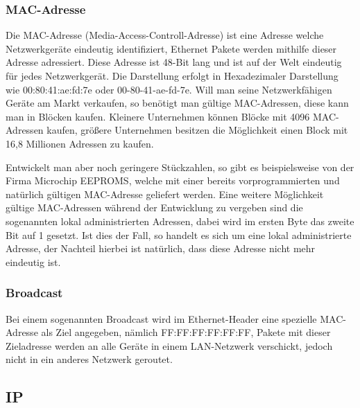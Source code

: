 \documentclass[a4paper,14pt,headsepline]{scrartcl}
\begin{document}
\subsubsection{MAC-Adresse}
Die MAC-Adresse (Media-Access-Controll-Adresse) ist eine Adresse welche Netzwerkgeräte eindeutig identifiziert, Ethernet Pakete werden mithilfe dieser Adresse adressiert. Diese Adresse ist 48-Bit lang und ist auf der Welt eindeutig für jedes Netzwerkgerät. Die Darstellung erfolgt in Hexadezimaler Darstellung wie 00:80:41:ae:fd:7e oder 00-80-41-ae-fd-7e. Will man seine Netzwerkfähigen Geräte am Markt verkaufen, so benötigt man gültige MAC-Adressen, diese kann man in Blöcken kaufen. Kleinere Unternehmen können Blöcke mit 4096 MAC-Adressen kaufen, größere Unternehmen besitzen die Möglichkeit einen Block mit 16,8 Millionen Adressen zu kaufen.

Entwickelt man aber noch geringere Stückzahlen, so gibt es beispielsweise von der Firma Microchip EEPROMS, welche mit einer bereits vorprogrammierten und natürlich gültigen MAC-Adresse geliefert werden. Eine weitere Möglichkeit gültige MAC-Adressen während der Entwicklung zu vergeben sind die sogenannten lokal administrierten Adressen, dabei wird im ersten Byte das zweite Bit auf 1 gesetzt. Ist dies der Fall, so handelt es sich um eine lokal administrierte Adresse, der Nachteil hierbei ist natürlich, dass diese Adresse nicht mehr eindeutig ist.

\subsubsection{Broadcast}
Bei einem sogenannten Broadcast wird im Ethernet-Header eine spezielle MAC-Adresse als Ziel angegeben, nämlich FF:FF:FF:FF:FF:FF, Pakete mit dieser Zieladresse werden an alle Geräte in einem LAN-Netzwerk verschickt, jedoch nicht in ein anderes Netzwerk geroutet.

\subsection{IP}
\end{document}
